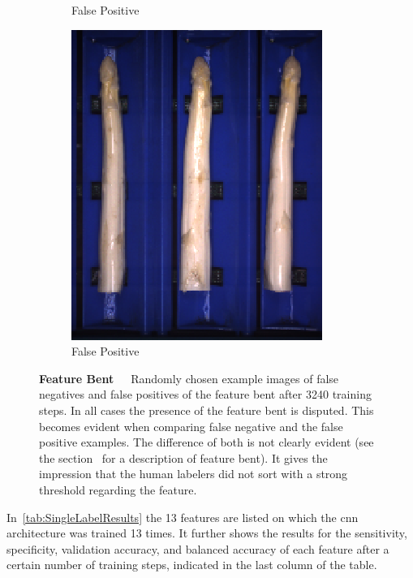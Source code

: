 \begin{figure}[!htb]
\begin{subfigure}{0.3\textwidth}
		\vspace{-5pt}
		\caption{False Positive}
	\end{subfigure}
	\begin{subfigure}{0.3\textwidth}
		\includegraphics[width=0.9\linewidth]{Figures/chapter04/bent_falsepositive_03.png}
		\vspace{-5pt}
		\caption{False Positive}
	\end{subfigure}
	\vspace{-5pt}
    \caption[Single-Label CNN Example Images Feature Bent]{\textbf{Feature Bent}~~~Randomly chosen example images of false negatives and false positives of the feature bent after 3240 training steps. In all cases the presence of the feature bent is disputed. This becomes evident when comparing false negative and the false positive examples. The difference of both is not clearly evident (see the section~ for a description of feature bent). It gives the impression that the human labelers did not sort with a strong threshold regarding the feature.}
    \label{fig:ExampleImagesBent}
\end{figure}

\bigskip
In~\autoref{tab:SingleLabelResults} the 13 features are listed on which the \acrshort{cnn} architecture was trained 13 times. It further shows the results for the sensitivity, specificity, validation accuracy, and balanced accuracy of each feature after a certain number of training steps, indicated in the last column of the table.

